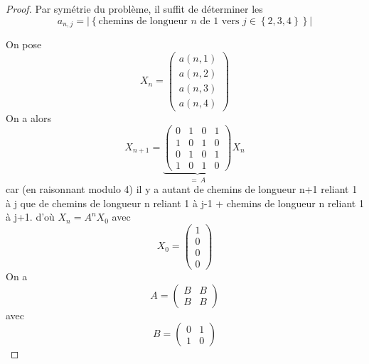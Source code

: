 \begin{proof}
    Par symétrie du problème, il suffit de déterminer les
    \begin{equation}
        a_{n,j}=\left\lvert\left\lbrace\text{chemins de longueur }n\text{ de }1\text{ vers }j\in\left\lbrace2,3,4\right\rbrace\right\rbrace\right\rvert
    \end{equation}

    On pose 
    \begin{equation}
        X_{n}=
        \begin{pmatrix}
            a(n,1)\\
            a(n,2)\\
            a(n,3)\\
            a(n,4)
        \end{pmatrix}
    \end{equation}
    On a alors 
    \begin{equation}
        X_{n+1}=
        \underbrace{
        \begin{pmatrix}
            0 &1 &0 &1\\
            1 &0 &1 &0\\
            0 &1 &0 &1\\
            1 &0 &1 &0
        \end{pmatrix}}_{=~A}
        X_{n}
    \end{equation}
    car (en raisonnant modulo 4) il y a autant de chemins de longueur n+1 reliant 1 à j que de chemins de longueur n reliant 1 à j-1 + chemins de longueur n reliant 1 à j+1.
    d'où $X_{n}=A^{n}X_{0}$ avec 
    \begin{equation}
        X_{0}=
        \begin{pmatrix}
            1\\0\\0\\0
        \end{pmatrix}
    \end{equation}
    On a
    \begin{equation}
        A=
        \begin{pmatrix}
            B&B\\B&B
        \end{pmatrix}
    \end{equation}
    avec
    \begin{equation}
        B=
        \begin{pmatrix}
            0&1\\1&0
        \end{pmatrix}

\end{equation}
\end{proof}
